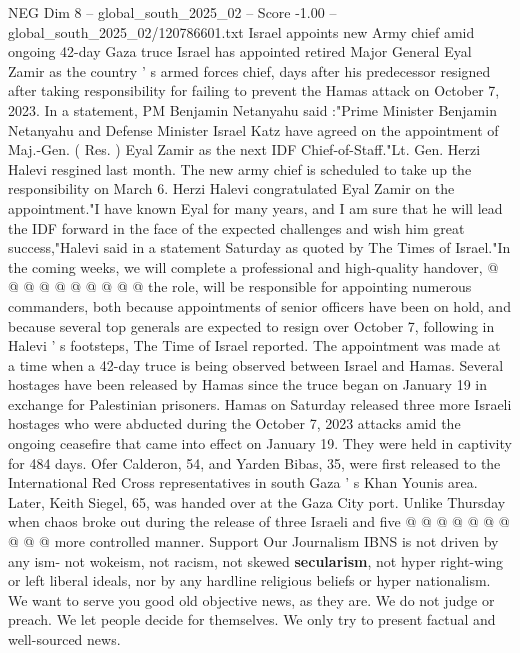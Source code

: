 \begin{textsample}{NEG Dim 8 – global\_south\_2025\_02 – Score -1.00 – global\_south\_2025\_02/120786601.txt}  \label{ex:f8_neg_064}
Israel appoints new Army chief amid ongoing 42-day Gaza truce Israel has appointed retired Major General Eyal Zamir as the country ' s armed forces chief, days after his predecessor resigned after taking responsibility for failing to prevent the Hamas attack on October 7, 2023.
In a statement, PM Benjamin Netanyahu said :"Prime Minister Benjamin Netanyahu and Defense Minister Israel Katz have agreed on the appointment of Maj.-Gen. ( Res. ) Eyal Zamir as the next IDF Chief-of-Staff."Lt.
Gen.
Herzi Halevi resgined last month.
The new army chief is scheduled to take up the responsibility on March 6.
Herzi Halevi congratulated Eyal Zamir on the appointment."I have known Eyal for many years, and I am sure that he will lead the IDF forward in the face of the expected challenges and wish him great success,"Halevi said in a statement Saturday as quoted by The Times of Israel."In the coming weeks, we will complete a professional and high-quality handover, @ @ @ @ @ @ @ @ @ @ the role, will be responsible for appointing numerous commanders, both because appointments of senior officers have been on hold, and because several top generals are expected to resign over October 7, following in Halevi ' s footsteps, The Time of Israel reported.
The appointment was made at a time when a 42-day truce is being observed between Israel and Hamas.
Several hostages have been released by Hamas since the truce began on January 19 in exchange for Palestinian prisoners.
Hamas on Saturday released three more Israeli hostages who were abducted during the October 7, 2023 attacks amid the ongoing ceasefire that came into effect on January 19.
They were held in captivity for 484 days.
Ofer Calderon, 54, and Yarden Bibas, 35, were first released to the International Red Cross representatives in south Gaza ' s Khan Younis area.
Later, Keith Siegel, 65, was handed over at the Gaza City port.
Unlike Thursday when chaos broke out during the release of three Israeli and five @ @ @ @ @ @ @ @ @ @ more controlled manner.
Support Our Journalism IBNS is not driven by any ism- not wokeism, not racism, not skewed \textbf{secularism}, not hyper right-wing or left liberal ideals, nor by any hardline religious beliefs or hyper nationalism.
We want to serve you good old objective news, as they are.
We do not judge or preach.
We let people decide for themselves.
We only try to present factual and well-sourced news.

\end{textsample}
